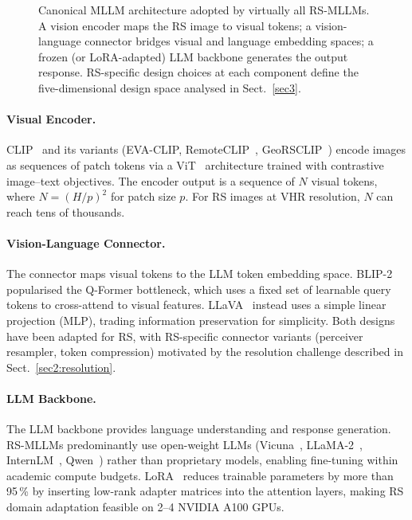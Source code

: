 \begin{figure}[h]
\caption{Canonical MLLM architecture adopted by virtually all RS-MLLMs.
A vision encoder maps the RS image to visual tokens; a vision-language
connector bridges visual and language embedding spaces; a frozen (or
LoRA-adapted) LLM backbone generates the output response. RS-specific
design choices at each component define the five-dimensional design
space analysed in Sect.~\ref{sec3}.}\label{fig:mllm_blueprint}
\end{figure}

\paragraph{Visual Encoder.}
CLIP~\cite{clip2021} and its variants (EVA-CLIP, RemoteCLIP~\cite{remoteclip2024},
GeoRSCLIP~\cite{georscclip2024}) encode images as sequences of patch tokens via
a ViT~\cite{dosovitskiy2021vit} architecture trained with contrastive
image--text objectives. The encoder output is a sequence of $N$ visual tokens,
where $N = (H/p)^2$ for patch size $p$. For RS images at VHR resolution,
$N$ can reach tens of thousands.

\paragraph{Vision-Language Connector.}
The connector maps visual tokens to the LLM token embedding space.
BLIP-2~\cite{blip22023,li2023blip} popularised the Q-Former bottleneck, which uses
a fixed set of learnable query tokens to cross-attend to visual features.
LLaVA~\cite{llava2023} instead uses a simple linear projection (MLP),
trading information preservation for simplicity. Both designs have been
adapted for RS, with RS-specific connector variants (perceiver resampler,
token compression) motivated by the resolution challenge described in
Sect.~\ref{sec2:resolution}.

\paragraph{LLM Backbone.}
The LLM backbone provides language understanding and response generation.
RS-MLLMs predominantly use open-weight LLMs (Vicuna~\cite{vicuna2023},
LLaMA-2~\cite{llama2023}, InternLM~\cite{internlm2023}, Qwen~\cite{qwen2023})
rather than proprietary models, enabling fine-tuning within academic compute
budgets. LoRA~\cite{hu2022lora} reduces trainable parameters by more than
95\,\% by inserting low-rank adapter matrices into the attention layers, making
RS domain adaptation feasible on 2--4 NVIDIA A100 GPUs.

